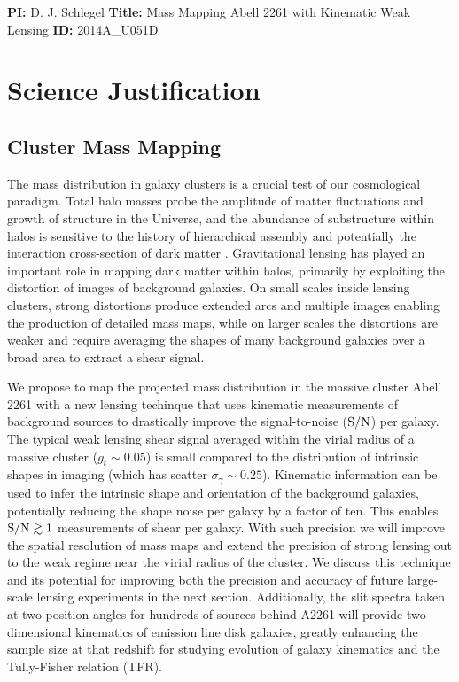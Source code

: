 \documentclass[12pt]{article}
\begin{document}
\textbf{PI:} D. J. Schlegel \textbf{Title:} Mass Mapping Abell 2261 with Kinematic Weak Lensing \textbf{ID:} 2014A\_U051D

\section{Science Justification}


\subsection{Cluster Mass Mapping}

The mass distribution in galaxy clusters is a crucial test of our cosmological paradigm. Total halo masses probe the amplitude of matter fluctuations and growth of structure in the Universe, and the abundance of substructure within halos is sensitive to the history of hierarchical assembly and potentially the interaction cross-section of dark matter \citep[e.g.,][]{Natarajan2002a, Natarajan2002b, Voit2005, Clowe2006}. Gravitational lensing has played an important role in mapping dark matter within halos, primarily by exploiting the distortion of images of background galaxies. On small scales inside lensing clusters, strong distortions produce extended arcs and multiple images enabling the production of detailed mass maps, while on larger scales the distortions are weaker and require averaging the shapes of many background galaxies over a broad area to extract a shear signal.

We propose to map the projected mass distribution in the massive cluster Abell 2261 with a new lensing techinque that uses kinematic measurements of background sources to drastically improve the signal-to-noise (${\rm S/N}$) per galaxy. The typical weak lensing shear signal averaged within the virial radius of a massive cluster ($g_t\sim0.05$) is small compared to the distribution of intrinsic shapes in imaging (which has scatter $\sigma_\gamma\sim0.25$). Kinematic information can be used to infer the intrinsic shape and orientation of the background galaxies, potentially reducing the shape noise per galaxy by a factor of ten. This enables ${\rm S/N}\gtrsim1$ measurements of shear per galaxy. With such precision we will improve the spatial resolution of mass maps and extend the precision of strong lensing out to the weak regime near the virial radius of the cluster. We discuss this technique and its potential for improving both the precision and accuracy of future large-scale lensing experiments in the next section. Additionally, the slit spectra taken at two position angles for hundreds of sources behind A2261 will provide two-dimensional kinematics of emission line disk galaxies, greatly enhancing the sample size at that redshift for studying evolution of galaxy kinematics and the Tully-Fisher relation (TFR).
\end{document}
